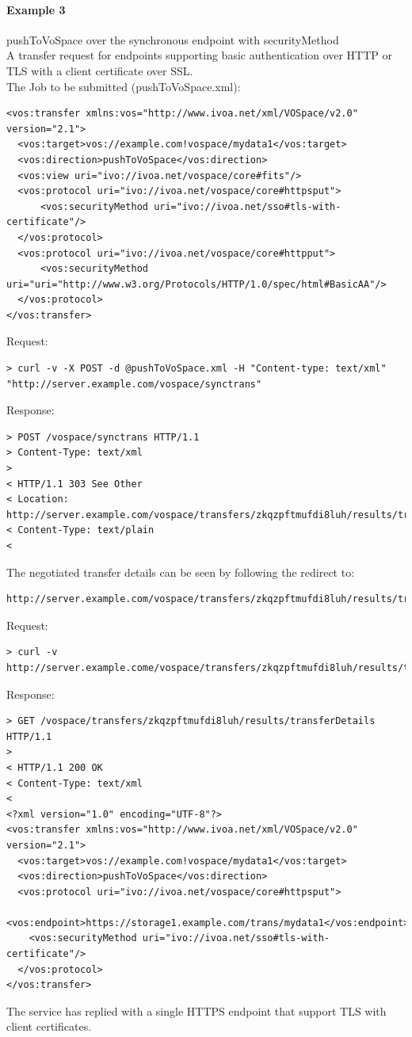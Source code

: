 \documentclass[11pt,a4paper]{ivoa}
\begin{document}
\paragraph{Example 3}
pushToVoSpace over the synchronous endpoint with securityMethod
\\[5px]
\noindent
A transfer request for endpoints supporting basic authentication over HTTP or TLS with a client certificate over SSL.\\
The Job to be submitted (pushToVoSpace.xml):
\begin{lstlisting}
<vos:transfer xmlns:vos="http://www.ivoa.net/xml/VOSpace/v2.0" version="2.1">
  <vos:target>vos://example.com!vospace/mydata1</vos:target>
  <vos:direction>pushToVoSpace</vos:direction>
  <vos:view uri="ivo://ivoa.net/vospace/core#fits"/>
  <vos:protocol uri="ivo://ivoa.net/vospace/core#httpsput">
      <vos:securityMethod uri="ivo://ivoa.net/sso#tls-with-certificate"/>
  </vos:protocol>
  <vos:protocol uri="ivo://ivoa.net/vospace/core#httpput">
      <vos:securityMethod uri="uri="http://www.w3.org/Protocols/HTTP/1.0/spec/html#BasicAA"/>
  </vos:protocol>
</vos:transfer>
\end{lstlisting}
Request:
\begin{lstlisting}
> curl -v -X POST -d @pushToVoSpace.xml -H "Content-type: text/xml" "http://server.example.com/vospace/synctrans"
\end{lstlisting}
Response:
\begin{lstlisting}
> POST /vospace/synctrans HTTP/1.1
> Content-Type: text/xml
>
< HTTP/1.1 303 See Other
< Location: http://server.example.com/vospace/transfers/zkqzpftmufdi8luh/results/transferDetails
< Content-Type: text/plain
<
\end{lstlisting}
The negotiated transfer details can be seen by following the redirect to:
\begin{lstlisting}
http://server.example.com/vospace/transfers/zkqzpftmufdi8luh/results/transferDetails
\end{lstlisting}
Request:
\begin{lstlisting}
> curl -v http://server.example.come/vospace/transfers/zkqzpftmufdi8luh/results/transferDetails
\end{lstlisting}
Response:
\begin{lstlisting}
> GET /vospace/transfers/zkqzpftmufdi8luh/results/transferDetails HTTP/1.1
>
< HTTP/1.1 200 OK
< Content-Type: text/xml
<
<?xml version="1.0" encoding="UTF-8"?>
<vos:transfer xmlns:vos="http://www.ivoa.net/xml/VOSpace/v2.0" version="2.1">
  <vos:target>vos://example.com!vospace/mydata1</vos:target>
  <vos:direction>pushToVoSpace</vos:direction>
  <vos:protocol uri="ivo://ivoa.net/vospace/core#httpsput">
    <vos:endpoint>https://storage1.example.com/trans/mydata1</vos:endpoint>
    <vos:securityMethod uri="ivo://ivoa.net/sso#tls-with-certificate"/>
  </vos:protocol>
</vos:transfer>
\end{lstlisting}
The service has replied with a single HTTPS endpoint that support TLS with client certificates.
\end{document}
